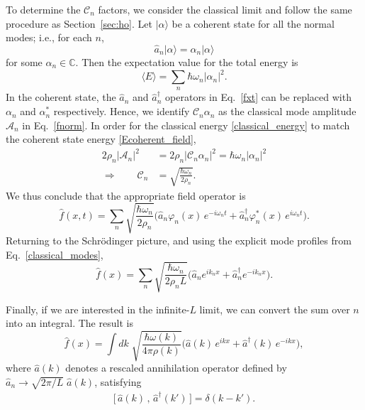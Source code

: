 \documentclass[prx,12pt]{revtex4-2}
\begin{document}
To determine the $\mathcal{C}_n$ factors, we consider the classical
limit and follow the same procedure as Section~\ref{sec:ho}.  Let
$|\alpha\rangle$ be a coherent state for all the normal modes; i.e.,
for each $n$,
\begin{equation}
  \hat{a}_n |\alpha\rangle = \alpha_n |\alpha\rangle
\end{equation}
for some $\alpha_n \in \mathbb{C}$.  Then the expectation value for
the total energy is
\begin{equation}
  \langle E\rangle = \sum_n \hbar \omega_n |\alpha_n|^2.
  \label{Ecoherent_field}
\end{equation}
In the coherent state, the $\hat{a}_n$ and $\hat{a}_n^\dagger$
operators in Eq.~\eqref{fxt} can be replaced with $\alpha_n$ and
$\alpha_n^*$ respectively.  Hence, we identify $\mathcal{C}_n
\alpha_n$ as the classical mode amplitude $\mathcal{A}_n$ in
Eq.~\eqref{fnorm}.  In order for the classical energy
\eqref{classical_energy} to match the coherent state energy
\eqref{Ecoherent_field},
\begin{align}
  2\rho_n |\mathcal{A}_n|^2 &= 2 \rho_n |\mathcal{C}_n\alpha_n|^2
  = \hbar \omega_n |\alpha_n|^2 \\ \Rightarrow \qquad
  \mathcal{C}_n &= \sqrt{\frac{\hbar\omega_n}{2\rho_n}}.
\end{align}
We thus conclude that the appropriate field operator is
\begin{equation}
  \hat{f}(x,t) = \sum_n \sqrt{\frac{\hbar\omega_n}{2\rho_n}}
  \Big(\hat{a}_n \varphi_n(x) \,e^{-i\omega_nt}
  + \hat{a}_n^\dagger \varphi_n^*(x) \, e^{i\omega_nt} \Big).
\end{equation}
Returning to the Schr\"odinger picture, and using the explicit mode
profiles from Eq.~\eqref{classical_modes},
\begin{equation}
  \hat{f}(x) = \sum_n \sqrt{\frac{\hbar\omega_n}{2\rho_n L}}
  \Big(\hat{a}_n e^{ik_n x}
  + \hat{a}_n^\dagger e^{-ik_n x} \Big).
\end{equation}

Finally, if we are interested in the infinite-$L$ limit, we can
convert the sum over $n$ into an integral.
The result is
\begin{equation}
  \hat{f}(x) = \int dk\; \sqrt{\frac{\hbar\omega(k)}{4\pi\rho(k)}}
  \Big(\hat{a}(k)\, e^{ik x} + \hat{a}^\dagger(k)\, e^{-ik x} \Big),
\end{equation}
where $\hat{a}(k)$ denotes a rescaled annihilation operator defined by
$\hat{a}_n \rightarrow \sqrt{2\pi/L}\; \hat{a}(k)$, satisfying
\begin{align}
  \big[\,\hat{a}(k)\,,\, \hat{a}^\dagger(k')\,\big] = \delta(k-k').
\end{align}
\end{document}
